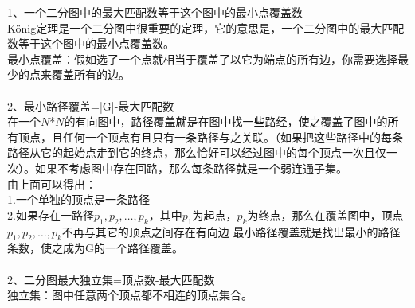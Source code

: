 1、一个二分图中的最大匹配数等于这个图中的最小点覆盖数 \\
König定理是一个二分图中很重要的定理，它的意思是，一个二分图中的最大匹配数等于这个图中的最小点覆盖数。 \\
最小点覆盖：假如选了一个点就相当于覆盖了以它为端点的所有边，你需要选择最少的点来覆盖所有的边。 \\ \\
2、最小路径覆盖=|G|-最大匹配数 \\
在一个$N$*$N$的有向图中，路径覆盖就是在图中找一些路经，使之覆盖了图中的所有顶点，且任何一个顶点有且只有一条路径与之关联。（如果把这些路径中的每条路径从它的起始点走到它的终点，那么恰好可以经过图中的每个顶点一次且仅一次）。如果不考虑图中存在回路，那么每条路径就是一个弱连通子集。 \\
由上面可以得出： \\
1.一个单独的顶点是一条路径 \\
2.如果存在一路径$p_1, p_2, \dots, p_k$，其中$p_1$为起点，$p_k$为终点，那么在覆盖图中，顶点$p_1, p_2, \dots, p_k$不再与其它的顶点之间存在有向边
最小路径覆盖就是找出最小的路径条数，使之成为G的一个路径覆盖。 \\ \\
2、二分图最大独立集=顶点数-最大匹配数 \\
独立集：图中任意两个顶点都不相连的顶点集合。 \\
